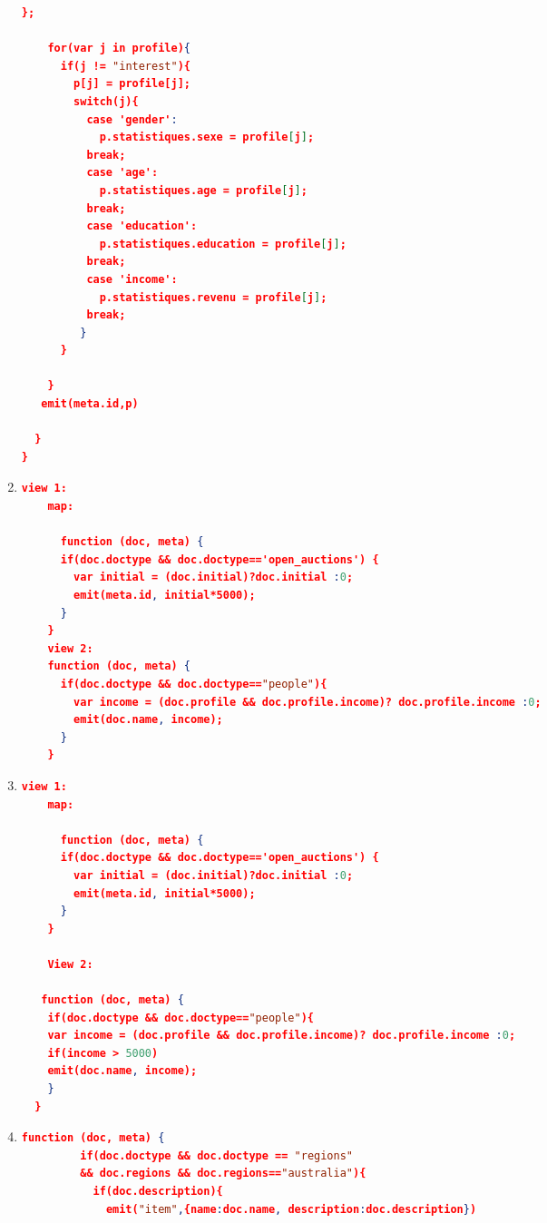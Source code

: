 \begin{enumerate}[label=Q\arabic*.]
\begin{lstlisting}[language=JSON, basicstyle=\scriptsize]
            };
    
    for(var j in profile){
      if(j != "interest"){
       	p[j] = profile[j];
        switch(j){
          case 'gender':
            p.statistiques.sexe = profile[j];  
          break;
          case 'age':
            p.statistiques.age = profile[j];  
          break;
          case 'education':
            p.statistiques.education = profile[j];  
          break;
          case 'income':
            p.statistiques.revenu = profile[j];  
          break;
         }
      }
      
    }
   emit(meta.id,p) 
  
  }
}
	\end{lstlisting}
	
	
    \item %
	\begin{lstlisting}[language=JSON, basicstyle=\scriptsize]
	view 1: 
	map:
	
	  function (doc, meta) {
      if(doc.doctype && doc.doctype=='open_auctions') {
        var initial = (doc.initial)?doc.initial :0;
      	emit(meta.id, initial*5000);	
      }
    }
    view 2: 
    function (doc, meta) {
      if(doc.doctype && doc.doctype=="people"){
        var income = (doc.profile && doc.profile.income)? doc.profile.income :0;
        emit(doc.name, income);
      }
    }
	\end{lstlisting}
	
	\item %
	\begin{lstlisting}[language=JSON, basicstyle=\scriptsize]
	view 1: 
	map:
	
	  function (doc, meta) {
      if(doc.doctype && doc.doctype=='open_auctions') {
        var initial = (doc.initial)?doc.initial :0;
      	emit(meta.id, initial*5000);	
      }
    }
    
    View 2: 
    
   function (doc, meta) {
    if(doc.doctype && doc.doctype=="people"){
    var income = (doc.profile && doc.profile.income)? doc.profile.income :0;
    if(income > 5000)
    emit(doc.name, income);
    }
  }
	\end{lstlisting}
	
	
    \item %
	\begin{lstlisting}[language=JSON, basicstyle=\scriptsize]
	   function (doc, meta) {
	     if(doc.doctype && doc.doctype == "regions" 
	     && doc.regions && doc.regions=="australia"){
	       if(doc.description){
	         emit("item",{name:doc.name, description:doc.description})
	       

\end{lstlisting}
\end{enumerate}
